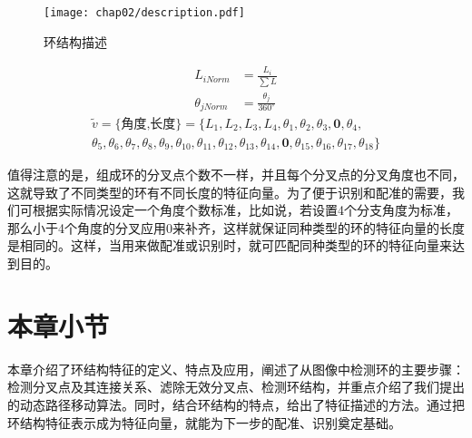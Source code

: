 \begin{figure}[H]
\centering
\texttt{[image: chap02/description.pdf]}
\caption{环结构描述}
\label{fig:description}
\end{figure}
\begin{align}
L_{iNorm}&=\frac{L_i}{\sum{L}}\label{eq:length}\\
\theta_{jNorm}&=\frac{\theta_j}{360^\circ}\label{eq:angle}
\end{align}
\begin{multline}
\tilde{v}=\{\textrm{角度,长度}\}=\{L_{1},L_{2},L_{3},L_{4},\theta_{1},\theta_{2},\theta_{3},\mathbf{0},\theta_{4},\\\theta_{5},\theta_{6},\theta_{7},\theta_{8},\theta_{9},\theta_{10},\theta_{11},\theta_{12},\theta_{13},\theta_{14},\mathbf{0},\theta_{15},\theta_{16},\theta_{17},\theta_{18}\}
\label{eq:vector}
\end{multline}

值得注意的是，组成环的分叉点个数不一样，并且每个分叉点的分叉角度也不同，这就导致了不同类型的环有不同长度的特征向量。为了便于识别和配准的需要，我们可根据实际情况设定一个角度个数标准，比如说，若设置4个分支角度为标准，那么小于4个角度的分叉应用0来补齐，这样就保证同种类型的环的特征向量的长度是相同的。这样，当用来做配准或识别时，就可匹配同种类型的环的特征向量来达到目的。

\section{本章小节}
\label{}

本章介绍了环结构特征的定义、特点及应用，阐述了从图像中检测环的主要步骤：检测分叉点及其连接关系、滤除无效分叉点、检测环结构，并重点介绍了我们提出的动态路径移动算法。同时，结合环结构的特点，给出了特征描述的方法。通过把环结构特征表示成为特征向量，就能为下一步的配准、识别奠定基础。
